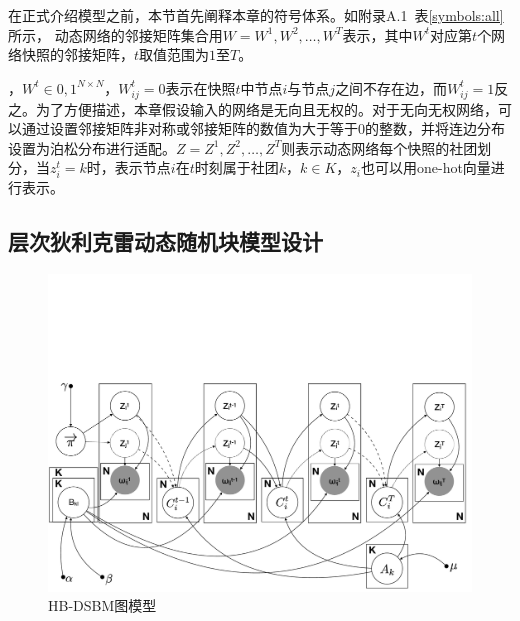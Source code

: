 在正式介绍模型之前，本节首先阐释本章的符号体系。如附录A.1~表\ref{symbols:all}所示，
动态网络的邻接矩阵集合用$W={W^1, W^2, \dots, W^T}$表示，其中$W^t$对应第$t$个网络快照的邻接矩阵，$t$取值范围为$1$至$T$。



，$W^t \in {0,1}^{N \times N}$，$W_{ij}^t = 0$表示在快照$t$中节点$i$与节点$j$之间不存在边，而$W_{ij}^t = 1$反之。为了方便描述，本章假设输入的网络是无向且无权的。对于无向无权网络，可以通过设置邻接矩阵非对称或邻接矩阵的数值为大于等于$0$的整数，并将连边分布设置为泊松分布进行适配。$Z = {Z^1, Z^2, \dots, Z^T}$则表示动态网络每个快照的社团划分，当$z_i^t = k$时，表示节点$i$在$t$时刻属于社团$k$，$k \in K$，$z_i$也可以用one-hot向量进行表示。

\subsection{层次狄利克雷动态随机块模型设计}

\begin{figure}[!htbp]
	\centering
	\setlength{\abovecaptionskip}{0pt} 
	\setlength{\belowcaptionskip}{10pt} 
	\includegraphics[width=.9\textwidth]{figures/chap04/graph-model_v3_cuted.pdf}
	\caption{HB-DSBM图模型}
	\label{fig.4.1}
\end{figure}



